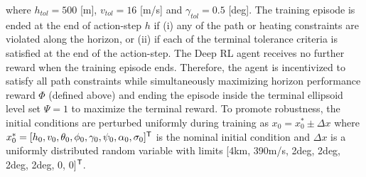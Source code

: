 \documentclass{UnderReview}
\begin{document}
where $h_{tol}=500$ [m], $v_{tol}=16$ [m/s] and $\gamma_{tol}=0.5$ [deg].  The training episode is ended at the end of action-step $h$ if (i) any of the path or heating constraints are violated along the horizon, or (ii) if each of the terminal tolerance criteria is satisfied at the end of the action-step.  The Deep RL agent receives no further reward when the training episode ends.  Therefore, the agent is incentivized to satisfy all path constraints while simultaneously maximizing horizon performance reward $\Phi$ (defined above) and ending the episode inside the terminal ellipsoid level set $\Psi=1$ to maximize the terminal reward.  To promote robustness, the initial conditions are perturbed uniformly during training as $x_0=x_0^* \pm \Delta x$ where $x_0^*= [h_0,v_0,\theta_0,\phi_0,\gamma_0,\psi_0, \alpha_0, \sigma_0]^\mathsf{T}$ is the nominal initial condition and $\Delta x$ is a uniformly distributed random variable with limits [4km, 390m/s, 2deg, 2deg, 2deg, 2deg, 0, 0]$^\mathsf{T}$.  
\end{document}
